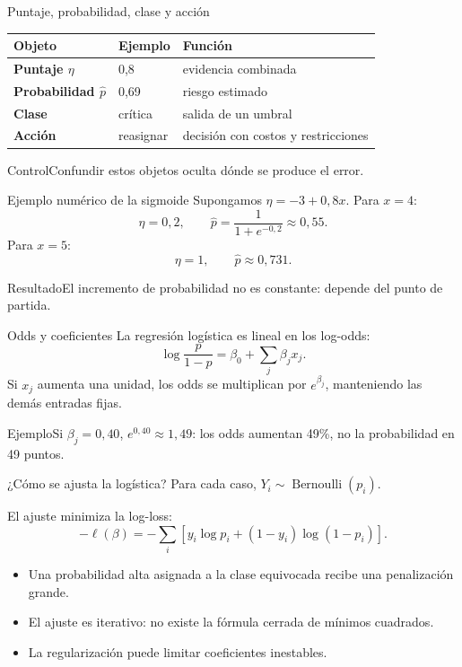 \documentclass[aspectratio=169,10pt]{beamer}
\begin{document}
\begin{frame}{Puntaje, probabilidad, clase y acción}
  \small
  \begin{tabularx}{\textwidth}{>{\bfseries}p{}p{}X}\toprule
  Objeto & Ejemplo & Función\\\midrule
  Puntaje $\eta$ & 0,8 & evidencia combinada\\
  Probabilidad $\widehat p$ & 0,69 & riesgo estimado\\
  Clase & crítica & salida de un umbral\\
  Acción & reasignar & decisión con costos y restricciones\\\bottomrule
  \end{tabularx}
  \begin{alertblock}{Control}Confundir estos objetos oculta dónde se produce el error.\end{alertblock}
\end{frame}

\begin{frame}{Ejemplo numérico de la sigmoide}
  \small
  Supongamos $\eta=-3+0{,}8x$.
  Para $x=4$:
  \[\eta=0{,}2,\qquad \widehat p=\frac{1}{1+e^{-0{,}2}}\approx0{,}55.\]
  Para $x=5$:
  \[\eta=1,\qquad \widehat p\approx0{,}731.\]
  \begin{block}{Resultado}El incremento de probabilidad no es constante: depende del punto de partida.\end{block}
\end{frame}

\begin{frame}{Odds y coeficientes}
  \small
  La regresión logística es lineal en los log-odds:
  \[\log\frac{p}{1-p}=\beta_0+\sum_j\beta_jx_j.\]
  Si $x_j$ aumenta una unidad, los odds se multiplican por $e^{\beta_j}$, manteniendo las demás entradas fijas.
  \begin{block}{Ejemplo}Si $\beta_j=0{,}40$, $e^{0{,}40}\approx1{,}49$: los odds aumentan 49\%, no la probabilidad en 49 puntos.\end{block}
\end{frame}

\begin{frame}{¿Cómo se ajusta la logística?}
  \small
  Para cada caso, $Y_i\sim\operatorname{Bernoulli}(p_i)$.

  El ajuste minimiza la log-loss:
  \[-\ell(\beta)=-\sum_i[y_i\log p_i+(1-y_i)\log(1-p_i)].\]
  \begin{itemize}
    \item Una probabilidad alta asignada a la clase equivocada recibe una penalización grande.
    \item El ajuste es iterativo: no existe la fórmula cerrada de mínimos cuadrados.
    \item La regularización puede limitar coeficientes inestables.
  \end{itemize}
\end{frame}
\end{document}

